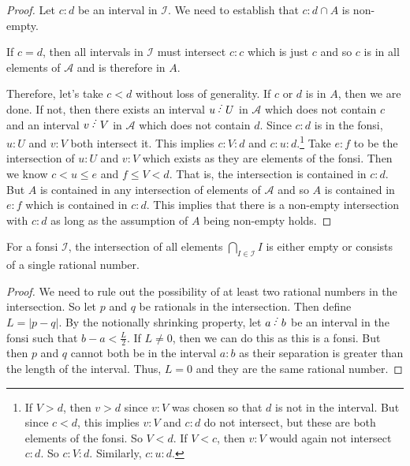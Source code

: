 \documentclass[12pt]{article}
\begin{document}
\begin{proof}
Let $c:d$ be an interval in $\mathcal{I}$. We need to establish that $c:d \cap A$ is non-empty. 

If $c=d$, then all intervals in $\mathcal{I}$ must intersect $c:c$ which is just $c$ and so $c$ is in all elements of $\mathcal{A}$ and is therefore in $A$.

Therefore, let's take $c < d$ without loss of generality. If $c$ or $d$ is in $A$, then we are done. If not, then there exists an interval $u\lte U$ in $\mathcal{A}$ which does not contain $c$ and an interval $v \lte V$ in $\mathcal{A}$ which does not contain $d$. Since $c:d$ is in the fonsi, $u:U$ and $v:V$ both intersect it. This implies $c : V : d$ and $c:u:d$.\footnote{ If $V > d$, then $v>d$ since $v:V$ was chosen so that $d$ is not in the interval. But since $c<d$, this implies $v:V$ and $c:d$ do not intersect, but these are both elements of the fonsi. So $V <d$. If $V < c$, then $v:V$ would again not intersect $c:d$. So $c:V:d$. Similarly, $c:u:d$. } Take $e:f$ to be the intersection of $u:U$ and $v:V$ which exists as they are elements of the fonsi. Then we know $c < u \leq e$ and $f \leq V < d$. That is, the intersection is contained in $c:d$. But $A$ is contained in any intersection of elements of $\mathcal{A}$ and so $A$ is contained in $e:f$ which is contained in $c:d$. This implies that there is a non-empty intersection with $c:d$ as long as the assumption of  $A$ being non-empty holds. 

\end{proof}

\begin{proposition}\label{pr:fon-unique-inter}
    For a fonsi $\mathcal I$, the intersection of all elements $\bigcap_{I \in \mathcal{I}} I$ is either empty or consists of a single rational number.
\end{proposition}

\begin{proof}
    We need to rule out the possibility of at least two rational numbers in the intersection. So let $p$ and $q$ be rationals in the intersection. Then define $L = |p - q|$. By the notionally shrinking property, let $a\lte b$ be an interval in the fonsi such that $b-a < \frac{L}{2}$. If $L \neq 0$, then we can do this as this is a fonsi. But then $p$ and $q$ cannot both be in the interval $a:b$ as their separation is greater than the length of the interval. Thus, $L=0$ and they are the same rational number. 
\end{proof}
\end{document}
